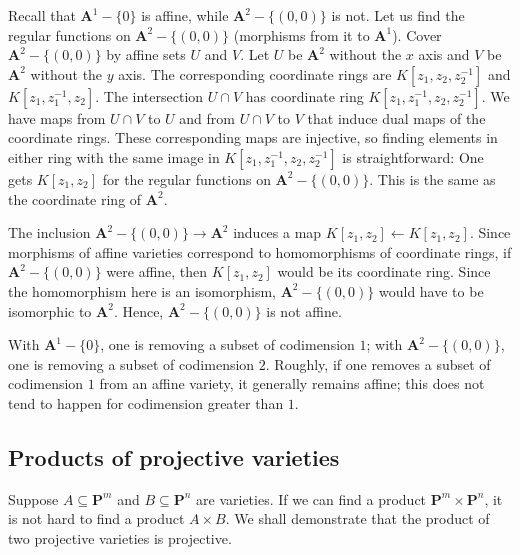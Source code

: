 \documentclass [11 pt, oneside] {article}
\begin{document}
\begin{example}[ ]\label{}
Recall that $\mathbf{A}^1-\{0\}$ is affine, while $\mathbf{A}^2 - \{(0,0)\}$ is not. Let us find the regular functions on $\mathbf{A}^2 - \{(0,0)\}$ (morphisms from it to $\mathbf{A}^1$). Cover $\mathbf{A}^2-\{(0,0)\}$ by affine sets $U$ and $V$. Let $U$ be $\mathbf{A}^2$ without the $x$ axis and $V$ be $\mathbf{A}^2$ without the $y$ axis. The corresponding coordinate rings are $K[z_1,z_2,z_2^{-1}]$ and $K[z_1,z_1^{-1},z_2]$. The intersection $U\cap V$ has coordinate ring $K[z_1,z_1^{-1},z_2,z_2^{-1}]$. We have maps from $U\cap V$ to $U$ and from $U\cap V$ to $V$ that induce dual maps of the coordinate rings. These corresponding maps are injective, so finding elements in either ring with the same image in $K[z_1,z_1^{-1},z_2,z_2^{-1}]$ is straightforward: One gets $K[z_1,z_2]$ for the regular functions on $\mathbf{A}^2-\{(0,0)\}$. This is the same as the coordinate ring of $\mathbf{A}^2$.

The inclusion $\mathbf{A}^2-\{(0,0)\}\longrightarrow \mathbf{A}^2$ induces a map $K[z_1,z_2] \longleftarrow K[z_1,z_2]$. Since morphisms of affine varieties correspond to homomorphisms of coordinate rings, if $\mathbf{A}^2-\{(0,0)\}$ were affine, then $K[z_1,z_2]$ would be its coordinate ring. Since the homomorphism here is an isomorphism, $\mathbf{A}^2-\{(0,0)\}$ would have to be isomorphic to $\mathbf{A}^2$. Hence, $\mathbf{A}^2-\{(0,0)\}$ is not affine.
\end{example}

\begin{remark}
	With $\mathbf{A}^1-\{0\}$, one is removing a subset of codimension $1$; with $\mathbf{A}^2-\{(0,0)\}$, one is removing a subset of codimension $2$. Roughly, if one removes a subset of codimension $1$ from an affine variety, it generally remains affine; this does not tend to happen for codimension greater than $1$.
\end{remark}


\subsection{Products of projective varieties}
Suppose $A\subseteq \mathbf{P}^m$ and $B\subseteq \mathbf{P}^n$ are varieties. If we can find a product $\mathbf{P}^m\times \mathbf{P}^n$, it is not hard to find a product $A\times B$. We shall demonstrate that the product of two projective varieties is projective.
\end{document}
